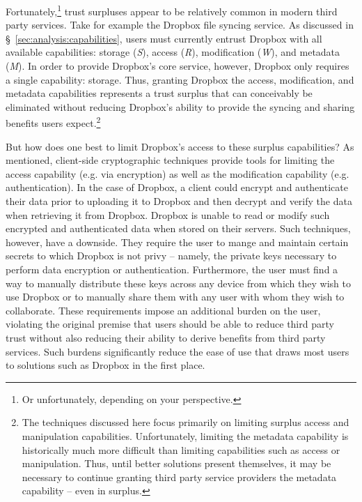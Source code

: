 Fortunately,\footnote{Or unfortunately, depending on your
  perspective.} trust surpluses appear to be relatively common in
modern third party services. Take for example the Dropbox file syncing
service. As discussed in \S~\ref{sec:analysis:capabilities}, users
must currently entrust Dropbox with all available capabilities:
storage (\emph{S}), access (\emph{R}), modification (\emph{W}), and
metadata (\emph{M}). In order to provide Dropbox's core service,
however, Dropbox only requires a single capability: storage. Thus,
granting Dropbox the access, modification, and metadata capabilities
represents a trust surplus that can conceivably be eliminated without
reducing Dropbox's ability to provide the syncing and sharing benefits
users expect.\footnote{The techniques discussed here focus primarily
  on limiting surplus access and manipulation
  capabilities. Unfortunately, limiting the metadata capability is
  historically much more difficult than limiting capabilities such as
  access or manipulation. Thus, until better solutions present
  themselves, it may be necessary to continue granting third party
  service providers the metadata capability -- even in surplus.}

But how does one best to limit Dropbox's access to these surplus
capabilities? As mentioned, client-side cryptographic techniques
provide tools for limiting the access capability (e.g. via encryption)
as well as the modification capability (e.g. authentication). In the
case of Dropbox, a client could encrypt and authenticate their data
prior to uploading it to Dropbox and then decrypt and verify the data
when retrieving it from Dropbox. Dropbox is unable to read or modify
such encrypted and authenticated data when stored on their
servers. Such techniques, however, have a downside. They require the
user to mange and maintain certain secrets to which Dropbox is not
privy -- namely, the private keys necessary to perform data encryption
or authentication. Furthermore, the user must find a way to manually
distribute these keys across any device from which they wish to use
Dropbox or to manually share them with any user with whom they wish to
collaborate. These requirements impose an additional burden on the
user, violating the original premise that users should be able to
reduce third party trust without also reducing their ability to derive
benefits from third party services. Such burdens significantly reduce
the ease of use that draws most users to solutions such as Dropbox in
the first place.

